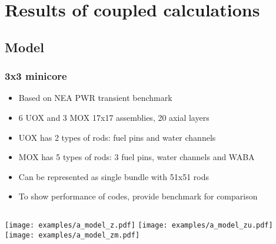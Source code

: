 \section{Results of coupled calculations}

\subsection{Model}
\begin{frame}[fragile]
    \frametitle{3x3 minicore}
    \begin{itemize}
        \item Based on NEA PWR transient benchmark
        \item 6 UOX and 3 MOX 17x17 assemblies, 20 axial layers
        \item UOX has 2 types of rods: fuel pins and water channels
        \item MOX has 5 types of rods: 3 fuel pins, water channels and WABA
        \item Can be represented as single bundle with 51x51 rods
        \item To show performance of codes, provide benchmark for comparison
    \end{itemize}
    \begin{columns}
        \texttt{[image: examples/a\_model\_z.pdf]}
        \texttt{[image: examples/a\_model\_zu.pdf]}
        \texttt{[image: examples/a\_model\_zm.pdf]}
    \end{columns}

\end{frame}


